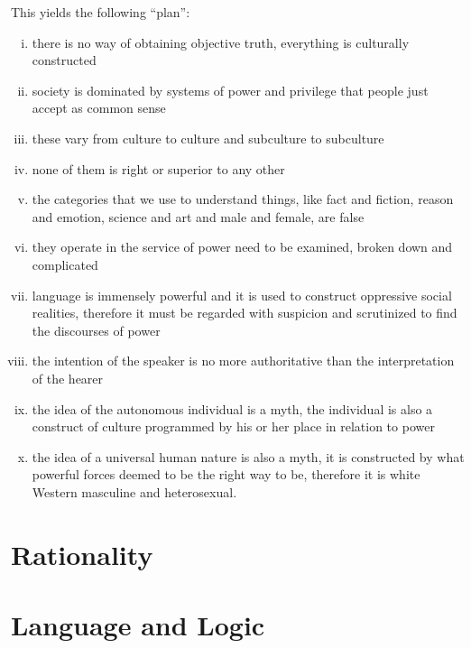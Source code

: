 \documentclass[10pt,titlepage]{article}
\begin{document}
This yields the following ``plan'':
     \begin{enumerate}[i)]
     \item there is no way of obtaining objective truth, everything is culturally constructed
     \item society is dominated by systems of power and privilege that people just accept as common sense
     \item these vary from culture to culture and subculture to subculture
     \item none of them is right or superior to any other
     \item the categories that we use to understand things, like fact and fiction, reason and emotion, science and art and male and female, are false
     \item they operate in the service of power need to be examined, broken down and complicated
     \item language is immensely powerful and it is used to construct oppressive social realities, therefore it must be regarded with suspicion and scrutinized to find the discourses of power
     \item the intention of the speaker is no more authoritative than the interpretation of the hearer
     \item the idea of the autonomous individual is a myth, the individual is also a construct of culture programmed by his or her place in relation to power
     \item the idea of a universal human nature is also a myth, it is constructed by what
powerful forces deemed to be the right way to be, therefore it is white Western masculine and heterosexual.
     \end{enumerate}

\section{Rationality}

\section{Language and Logic}




{}








\end{document}

